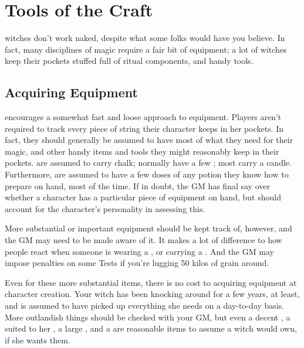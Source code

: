 \chapter{Tools of the Craft}

 witches don't work naked, despite what some folks would have you believe.
In fact, many disciplines of magic require a fair bit of equipment; a lot of witches keep their pockets stuffed full of ritual components, and handy tools.

\section{Acquiring Equipment}

 encourages a somewhat fast and loose approach to equipment.
Players aren't required to track every piece of string their character keeps in her pockets.
In fact, they should generally be assumed to have most of what they need for their magic, and other handy items and tools they might reasonably keep in their pockets.
 are assumed to carry chalk;  normally have a few ; most  carry a candle.
Furthermore,  are assumed to have a few doses of any potion they know how to prepare on hand, most of the time.
If in doubt, the GM has final say over whether a character has a particular piece of equipment on hand, but should account for the character's personality in assessing this.

More substantial or important equipment should be kept track of, however, and the GM may need to be made aware of it.
It makes a lot of difference to how people react when someone is wearing a , or carrying a .
And the GM may impose penalties on some Tests if you're lugging 50 kilos of grain around.

Even for these more substantial items, there is no cost to acquiring equipment at character creation.
Your witch has been knocking around for a few years, at least, and is assumed to have picked up everything she needs on a day-to-day basis.
More outlandish things should be checked with your GM, but even a decent , a  suited to her , a large , and a  are reasonable items to assume a witch would own, if she wants them.

